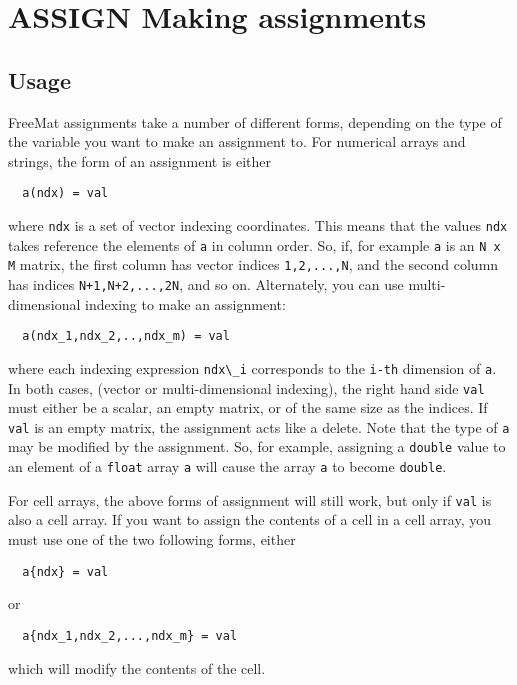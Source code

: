 \section{ASSIGN Making assignments}

\subsection{Usage}

FreeMat assignments take a number of different forms, depending 
on the type of the variable you want to make an assignment to.
For numerical arrays and strings, the form of an assignment
is either
\begin{verbatim}
  a(ndx) = val
\end{verbatim}
where \verb|ndx| is a set of vector indexing coordinates.  This means
that the values \verb|ndx| takes reference the elements of \verb|a| in column
order.  So, if, for example \verb|a| is an \verb|N x M| matrix, the first column
has vector indices \verb|1,2,...,N|, and the second column has indices
\verb|N+1,N+2,...,2N|, and so on.  Alternately, you can use multi-dimensional
indexing to make an assignment:
\begin{verbatim}
  a(ndx_1,ndx_2,..,ndx_m) = val
\end{verbatim}
where each indexing expression \verb|ndx\_i| corresponds to the \verb|i-th| dimension
of \verb|a|.  In both cases, (vector or multi-dimensional indexing), the
right hand side \verb|val| must either be a scalar, an empty matrix, or of the
same size as the indices.  If \verb|val| is an empty matrix, the assignment acts
like a delete.  Note that the type of \verb|a| may be modified by the assignment.
So, for example, assigning a \verb|double| value to an element of a \verb|float| 
array \verb|a| will cause the array \verb|a| to become \verb|double|.  

For cell arrays, the above forms of assignment will still work, but only
if \verb|val| is also a cell array.  If you want to assign the contents of
a cell in a cell array, you must use one of the two following forms, either
\begin{verbatim}
  a{ndx} = val
\end{verbatim}
or
\begin{verbatim}
  a{ndx_1,ndx_2,...,ndx_m} = val
\end{verbatim}
which will modify the contents of the cell.
